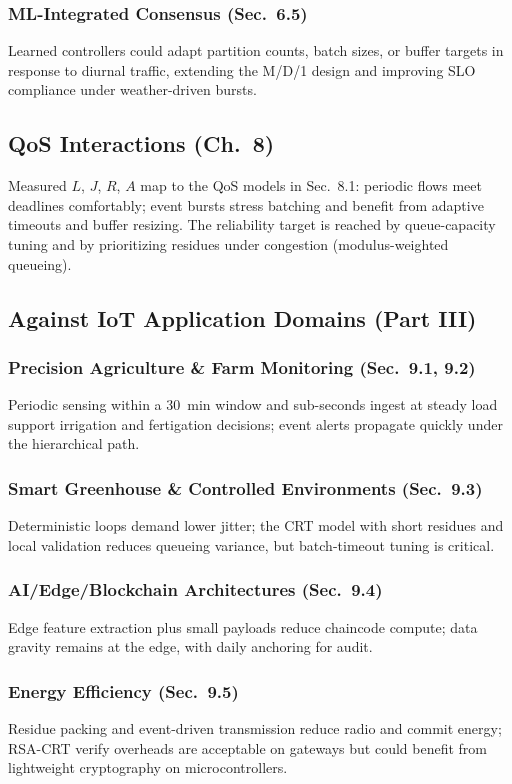 \subsubsection{ML-Integrated Consensus (Sec.~6.5)}
Learned controllers could adapt partition counts, batch sizes, or buffer targets in response to diurnal traffic, extending the M/D/1 design and improving SLO compliance under weather-driven bursts. %

\subsection{QoS Interactions (Ch.~8)}
Measured $L$, $J$, $R$, $A$ map to the QoS models in Sec.~8.1: periodic flows meet deadlines comfortably; event bursts stress batching and benefit from adaptive timeouts and buffer resizing. The reliability target is reached by queue-capacity tuning and by prioritizing residues under congestion (modulus-weighted queueing).

\subsection{Against IoT Application Domains (Part III)}
\subsubsection{Precision Agriculture \& Farm Monitoring (Sec.~9.1, 9.2)}
Periodic sensing within a 30~min window and sub-seconds ingest at steady load support irrigation and fertigation decisions; event alerts propagate quickly under the hierarchical path.

\subsubsection{Smart Greenhouse \& Controlled Environments (Sec.~9.3)}
Deterministic loops demand lower jitter; the CRT model with short residues and local validation reduces queueing variance, but batch-timeout tuning is critical.

\subsubsection{AI/Edge/Blockchain Architectures (Sec.~9.4)}
Edge feature extraction plus small payloads reduce chaincode compute; data gravity remains at the edge, with daily anchoring for audit.

\subsubsection{Energy Efficiency (Sec.~9.5)}
Residue packing and event-driven transmission reduce radio and commit energy; RSA-CRT verify overheads are acceptable on gateways but could benefit from lightweight cryptography on microcontrollers.

